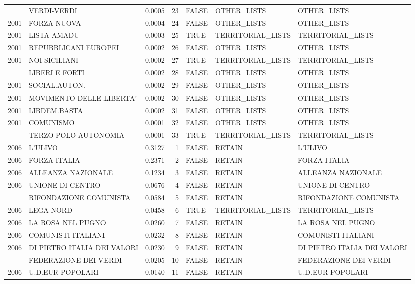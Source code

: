 \begin{longtable}[t]{rlrrlll}
\addlinespace
2001 & VERDI-VERDI & 0.0005 & 23 & FALSE & OTHER\_LISTS & OTHER\_LISTS\\
2001 & FORZA NUOVA & 0.0004 & 24 & FALSE & OTHER\_LISTS & OTHER\_LISTS\\
2001 & LISTA AMADU & 0.0003 & 25 & TRUE & TERRITORIAL\_LISTS & TERRITORIAL\_LISTS\\
2001 & REPUBBLICANI EUROPEI & 0.0002 & 26 & FALSE & OTHER\_LISTS & OTHER\_LISTS\\
2001 & NOI SICILIANI & 0.0002 & 27 & TRUE & TERRITORIAL\_LISTS & TERRITORIAL\_LISTS\\
\addlinespace
2001 & LIBERI E FORTI & 0.0002 & 28 & FALSE & OTHER\_LISTS & OTHER\_LISTS\\
2001 & SOCIAL.AUTON. & 0.0002 & 29 & FALSE & OTHER\_LISTS & OTHER\_LISTS\\
2001 & MOVIMENTO DELLE LIBERTA' & 0.0002 & 30 & FALSE & OTHER\_LISTS & OTHER\_LISTS\\
2001 & LIBDEM.BASTA & 0.0002 & 31 & FALSE & OTHER\_LISTS & OTHER\_LISTS\\
2001 & COMUNISMO & 0.0001 & 32 & FALSE & OTHER\_LISTS & OTHER\_LISTS\\
\addlinespace
2001 & TERZO POLO AUTONOMIA & 0.0001 & 33 & TRUE & TERRITORIAL\_LISTS & TERRITORIAL\_LISTS\\
2006 & L'ULIVO & 0.3127 & 1 & FALSE & RETAIN & L'ULIVO\\
2006 & FORZA ITALIA & 0.2371 & 2 & FALSE & RETAIN & FORZA ITALIA\\
2006 & ALLEANZA NAZIONALE & 0.1234 & 3 & FALSE & RETAIN & ALLEANZA NAZIONALE\\
2006 & UNIONE DI CENTRO & 0.0676 & 4 & FALSE & RETAIN & UNIONE DI CENTRO\\
\addlinespace
2006 & RIFONDAZIONE COMUNISTA & 0.0584 & 5 & FALSE & RETAIN & RIFONDAZIONE COMUNISTA\\
2006 & LEGA NORD & 0.0458 & 6 & TRUE & TERRITORIAL\_LISTS & TERRITORIAL\_LISTS\\
2006 & LA ROSA NEL PUGNO & 0.0260 & 7 & FALSE & RETAIN & LA ROSA NEL PUGNO\\
2006 & COMUNISTI ITALIANI & 0.0232 & 8 & FALSE & RETAIN & COMUNISTI ITALIANI\\
2006 & DI PIETRO ITALIA DEI VALORI & 0.0230 & 9 & FALSE & RETAIN & DI PIETRO ITALIA DEI VALORI\\
\addlinespace
2006 & FEDERAZIONE DEI VERDI & 0.0205 & 10 & FALSE & RETAIN & FEDERAZIONE DEI VERDI\\
2006 & U.D.EUR POPOLARI & 0.0140 & 11 & FALSE & RETAIN & U.D.EUR POPOLARI\\

\end{longtable}
